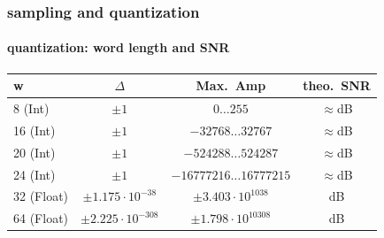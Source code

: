 	\begin{frame}\frametitle{sampling and quantization}\framesubtitle{quantization: word length and SNR}
			\begin{table}
			\centering
				\begin{footnotesize}
					\begin{tabular}{lccc}
					\hline
						\textbf{w} & \textbf{$\Delta$} & \textbf{Max.\ Amp} & \textbf{theo.\ SNR} \\
					\hline
						8 (Int)	&	$\pm1$ & $0\ldots255$ & $\approx$\unit[48]{dB}\\
						16 (Int)	&	$\pm1$ & $-32768\ldots32767$ & $\approx$\unit[96]{dB}\\
						20 (Int)	&	$\pm1$ & $-524288\ldots524287$ & $\approx$\unit[120]{dB}\\
						24 (Int)	&	$\pm1$ & $-16777216\ldots16777215$ & $\approx$\unit[144]{dB}\\
					\hline
						32 (Float)	&	$\pm1.175\cdot10^{-38}$ & $\pm3.403\cdot10^{1038}$ & \unit[1529]{dB}\\
						64 (Float)	&	$\pm2.225\cdot10^{-308}$ & $\pm1.798\cdot10^{10308}$ & \unit[12318]{dB}\\
					\hline
					\end{tabular}  
				\end{footnotesize}
			\end{table}
            \bigskip
	\end{frame}	
	
